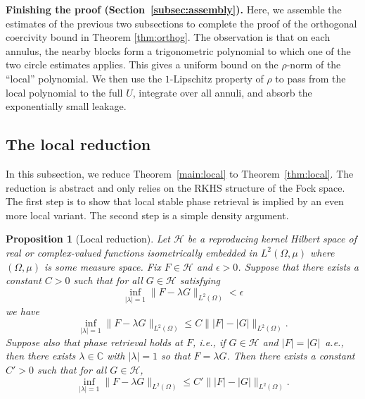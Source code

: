 \documentclass[11pt]{amsart}
\newtheorem{proposition}[theorem]{Proposition}
\theoremstyle{remark}
\begin{document}
\noindent
\textbf{Finishing the proof (Section~\ref{subsec:assembly}).}\;
Here, we assemble the estimates of the previous two subsections to complete the proof of the orthogonal coercivity bound in Theorem \ref{thm:orthog}. The observation is that on each annulus, the nearby blocks form a trigonometric polynomial to which
one of the two circle estimates applies.  This gives a uniform bound on the
$\rho$-norm of the ``local'' polynomial.  We then use the $1$-Lipschitz
property of $\rho$ to pass from the local polynomial to the full $U$,
integrate over all annuli, and absorb the exponentially small leakage.

\subsection{The local reduction}\label{subsec:local-reduction}
In this subsection, we  reduce Theorem~\ref{main:local} to Theorem~\ref{thm:local}. The reduction is abstract and only relies on the RKHS structure of  the Fock space. The first step is to show that local stable phase retrieval is implied by an
even more local variant. The second step is a simple density argument. 

\begin{proposition}[Local reduction]\label{prop:local-reduction}
Let \(\mathcal{H}\) be a reproducing kernel Hilbert space of real or complex-valued
functions isometrically embedded in \(L^2(\Omega,\mu)\) where $(\Omega,\mu)$ is some measure space. Fix \(F\in \mathcal{H}\) and
\(\epsilon>0\). Suppose that there exists a constant \(C>0\) such that for
all \(G\in \mathcal{H}\) satisfying
\[
\inf_{\lvert \lambda \rvert=1}\lVert F-\lambda G \rVert_{L^2(\Omega)}<\epsilon
\]
we have
\[
\inf_{\lvert \lambda \rvert=1}\lVert F-\lambda G \rVert_{L^2(\Omega)}
\le
C\lVert \lvert F \rvert-\lvert G \rvert \rVert_{L^2(\Omega)}.
\]
Suppose also that phase retrieval holds at \(F\), i.e., if \(G\in \mathcal{H}\) and
\(\lvert F \rvert=\lvert G \rvert\)~a.e., then there exists \(\lambda\in\mathbb{C}\) with
\(\lvert \lambda \rvert=1\) so that \(F=\lambda G\). Then there exists a constant
\(C'>0\) such that for all \(G\in \mathcal{H}\),
\[
\inf_{\lvert \lambda \rvert=1}\lVert F-\lambda G \rVert_{L^2(\Omega)}
\le
C'\lVert \lvert F \rvert-\lvert G \rvert \rVert_{L^2(\Omega)}.
\]
\end{proposition}
\end{document}
